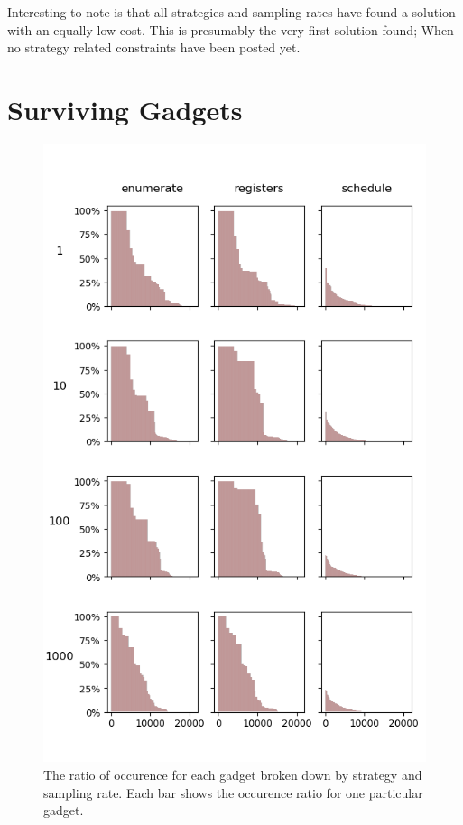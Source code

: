 Interesting to note is that all strategies and sampling rates have found a solution with
an equally low cost. This is presumably the very first solution found; When no strategy
related constraints have been posted yet.

\section{Surviving Gadgets} 
\begin{figure}[htp]
	\centering
	\includegraphics[width=\textwidth,height=\textheight]{results/figures/gadgets}
	\caption{The ratio of occurence for each gadget broken down by strategy and sampling rate.
Each bar shows the occurence ratio for one particular gadget.}
	\label{fig:gadgets}
\end{figure}

